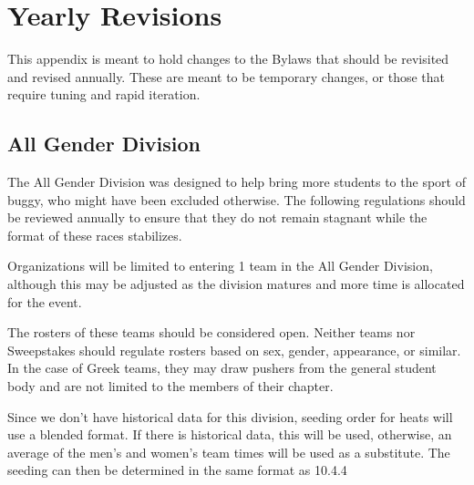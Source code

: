 \section{Yearly Revisions}

This appendix is meant to hold changes to the Bylaws that should be revisited and revised annually. These are meant to be temporary changes, or those that require tuning and rapid iteration. 

\subsection*{All Gender Division} \label{All Gender}

The All Gender Division was designed to help bring more students to the sport of buggy, who might have been excluded otherwise. The following regulations should be reviewed annually to ensure that they do not remain stagnant while the format of these races stabilizes. 

Organizations will be limited to entering 1 team in the All Gender Division, although this may be adjusted as the division matures and more time is allocated for the event. 

The rosters of these teams should be considered open. Neither teams nor Sweepstakes should regulate rosters based on sex, gender, appearance, or similar. In the case of Greek teams, they may draw pushers from the general student body and are not limited to the members of their chapter. 

Since we don't have historical data for this division, seeding order for heats will use a blended format. If there is historical data, this will be used, otherwise, an average of the men's and women's team times will be used as a substitute. The seeding can then be determined in the same format as 10.4.4

